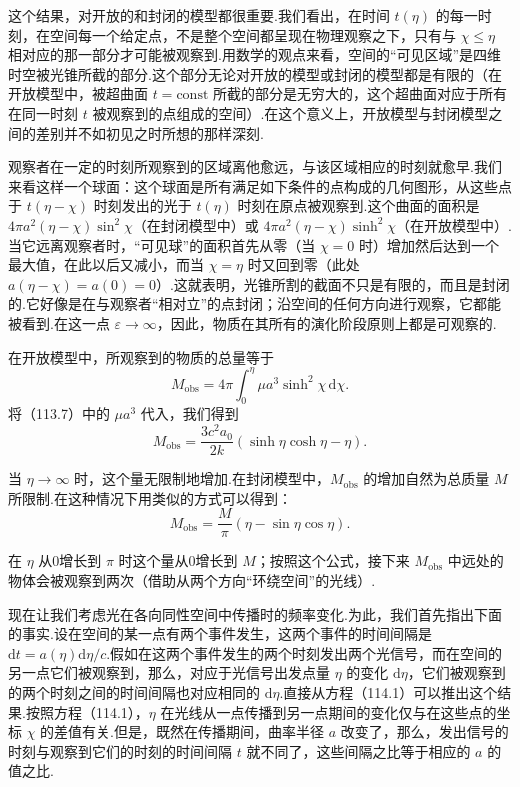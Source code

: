 这个结果，对开放的和封闭的模型都很重要.我们看出，在时间 $t(\eta)$ 的每一时刻，在空间每一个给定点，不是整个空间都呈现在物理观察之下，只有与 $\chi\leqslant\eta$ 相对应的那一部分才可能被观察到.用数学的观点来看，空间的“可见区域”是四维时空被光锥所截的部分.这个部分无论对开放的模型或封闭的模型都是有限的（在开放模型中，被超曲面 $t=\mathrm{const}$ 所截的部分是无穷大的，这个超曲面对应于所有在同一时刻 $t$ 被观察到的点组成的空间）.在这个意义上，开放模型与封闭模型之间的差别并不如初见之时所想的那样深刻.

观察者在一定的时刻所观察到的区域离他愈远，与该区域相应的时刻就愈早.我们来看这样一个球面：这个球面是所有满足如下条件的点构成的几何图形，从这些点于 $t(\eta-\chi)$ 时刻发出的光于 $t(\eta)$ 时刻在原点被观察到.这个曲面的面积是 $4\pi a^{2}(\eta-\chi)\sin^{2}\chi$（在封闭模型中）或 $4\pi a^{2}(\eta-\chi)\sinh^{2}\chi$（在开放模型中）.当它远离观察者时，“可见球”的面积首先从零（当 $\chi=0$ 时）增加然后达到一个最大值，在此以后又减小，而当 $\chi=\eta$ 时又回到零（此处 $a(\eta-\chi)=a(0)=0$）.这就表明，光锥所割的截面不只是有限的，而且是封闭的.它好像是在与观察者“相对立”的点封闭；沿空间的任何方向进行观察，它都能被看到.在这一点 $\varepsilon\to\infty$，因此，物质在其所有的演化阶段原则上都是可观察的.

在开放模型中，所观察到的物质的总量等于
\begin{equation*}
  M_{\mathrm{obs}}=4\pi\int_{0}^{\eta}\mu a^{3}\sinh^{2}\chi\,\mathrm{d}\chi.
\end{equation*}
将（113.7）中的 $\mu a^{3}$ 代入，我们得到
\begin{equation}
  M_{\mathrm{obs}}=\frac{3c^{2}a_{0}}{2k}
  (\sinh\eta\cosh\eta-\eta).
\end{equation}

当 $\eta\to\infty$ 时，这个量无限制地增加.在封闭模型中，$M_{\mathrm{obs}}$ 的增加自然为总质量 $M$ 所限制.在这种情况下用类似的方式可以得到：
\begin{equation}
  M_{\mathrm{obs}}=\frac{M}{\pi}(\eta-\sin\eta\cos\eta).
\end{equation}

在 $\eta$ 从0增长到 $\pi$ 时这个量从0增长到 $M$；按照这个公式，接下来 $M_{\mathrm{obs}}$ 中远处的物体会被观察到两次（借助从两个方向“环绕空间”的光线）.

现在让我们考虑光在各向同性空间中传播时的频率变化.为此，我们首先指出下面的事实.设在空间的某一点有两个事件发生，这两个事件的时间间隔是 $\mathrm{d}t=a(\eta)\mathrm{d}\eta/c$.假如在这两个事件发生的两个时刻发出两个光信号，而在空间的另一点它们被观察到，那么，对应于光信号出发点量 $\eta$ 的变化 $\mathrm{d}\eta$，它们被观察到的两个时刻之间的时间间隔也对应相同的 $\mathrm{d}\eta$.直接从方程（114.1）可以推出这个结果.按照方程（114.1），$\eta$ 在光线从一点传播到另一点期间的变化仅与在这些点的坐标 $\chi$ 的差值有关.但是，既然在传播期间，曲率半径 $a$ 改变了，那么，发出信号的时刻与观察到它们的时刻的时间间隔 $t$ 就不同了，这些间隔之比等于相应的 $a$ 的值之比.

